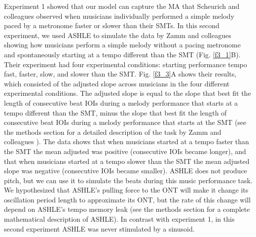 \documentclass{report}
\begin{document}
Experiment 1 showed that our model can capture the MA that Scheurich and colleagues \cite{scheurich2018tapping} observed when musicians individually performed a simple melody paced by a metronome faster or slower than their SMTs. In this second experiment, we used ASHLE to simulate the data by Zamm and colleagues \cite{zamm2018musicians} showing how musicians perform a simple melody without a pacing metronome and spontaneously starting at a tempo different than the SMT (Fig.{} \ref{f3_1}B). Their experiment had four experimental conditions: starting performance tempo fast, faster, slow, and slower than the SMT. Fig.{} \ref{f3_3}A shows their results, which consisted of the adjusted slope across musicians in the four different experimental conditions. The adjusted slope is equal to the slope that best fit the length of consecutive beat IOIs during a melody performance that starts at a tempo different than the SMT, minus the slope that best fit the length of consecutive beat IOIs during a melody performance that starts at the SMT (see the methods section for a detailed description of the task by Zamm and colleagues \cite{zamm2018musicians}). The data shows that when musicians started at a tempo faster than the SMT the mean adjusted was positive (consecutive IOIs became longer), and that when musicians started at a tempo slower than the SMT the mean adjusted slope was negative (consecutive IOIs became smaller). ASHLE does not produce pitch, but we can use it to simulate the beats during this music performance task. We hypothesized that ASHLE's pulling force to the ONT will make it change its oscillation period length to approximate its ONT, but the rate of this change will depend on ASHLE's tempo memory leak (see the methods section for a complete mathematical description of ASHLE). In contrast with experiment 1, in this second experiment ASHLE was never stimulated by a sinusoid. 
\end{document}

